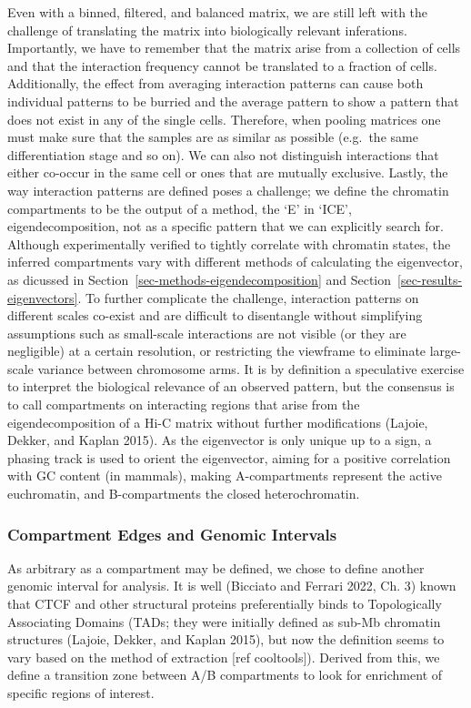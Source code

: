 \documentclass[
  11pt,
  a4paper,
]{scrbook}
\begin{document}
Even with a binned, filtered, and balanced matrix, we are still left
with the challenge of translating the matrix into biologically relevant
inferations. Importantly, we have to remember that the matrix arise from
a collection of cells and that the interaction frequency cannot be
translated to a fraction of cells. Additionally, the effect from
averaging interaction patterns can cause both individual patterns to be
burried and the average pattern to show a pattern that does not exist in
any of the single cells. Therefore, when pooling matrices one must make
sure that the samples are as similar as possible (e.g.~the same
differentiation stage and so on). We can also not distinguish
interactions that either co-occur in the same cell or ones that are
mutually exclusive. Lastly, the way interaction patterns are defined
poses a challenge; we define the chromatin compartments to be the output
of a method, the `E' in `ICE', eigendecomposition, not as a specific
pattern that we can explicitly search for. Although experimentally
verified to tightly correlate with chromatin states, the inferred
compartments vary with different methods of calculating the eigenvector,
as dicussed in Section~\ref{sec-methods-eigendecomposition} and
Section~\ref{sec-results-eigenvectors}. To further complicate the
challenge, interaction patterns on different scales co-exist and are
difficult to disentangle without simplifying assumptions such as
small-scale interactions are not visible (or they are negligible) at a
certain resolution, or restricting the viewframe to eliminate
large-scale variance between chromosome arms. It is by definition a
speculative exercise to interpret the biological relevance of an
observed pattern, but the consensus is to call compartments on
interacting regions that arise from the eigendecomposition of a Hi-C
matrix without further modifications (Lajoie, Dekker, and Kaplan 2015).
As the eigenvector is only unique up to a sign, a phasing track is used
to orient the eigenvector, aiming for a positive correlation with GC
content (in mammals), making A-compartments represent the active
euchromatin, and B-compartments the closed heterochromatin.

\subsubsection{Compartment Edges and Genomic
Intervals}\label{compartment-edges-and-genomic-intervals}

As arbitrary as a compartment may be defined, we chose to define another
genomic interval for analysis. It is well (Bicciato and Ferrari 2022,
Ch. 3) known that CTCF and other structural proteins preferentially
binds to Topologically Associating Domains (TADs; they were initially
defined as sub-Mb chromatin structures (Lajoie, Dekker, and Kaplan
2015), but now the definition seems to vary based on the method of
extraction {[}ref cooltools{]}). Derived from this, we define a
transition zone between A/B compartments to look for enrichment of
specific regions of interest.
\end{document}
